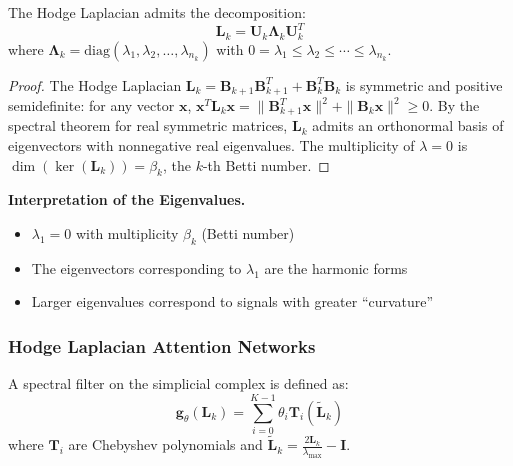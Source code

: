 \begin{theorem}\label{thm:descomposicion_hodge_laplacian}
The Hodge Laplacian admits the decomposition:
\begin{equation}
    \mathbf{L}_k = \mathbf{U}_k \boldsymbol{\Lambda}_k \mathbf{U}_k^T
\end{equation}
where $\boldsymbol{\Lambda}_k = \text{diag}(\lambda_1, \lambda_2, \ldots, \lambda_{n_k})$ with $0 = \lambda_1 \leq \lambda_2 \leq \cdots \leq \lambda_{n_k}$.
\end{theorem}

\begin{proof}
The Hodge Laplacian $\mathbf{L}_k = \mathbf{B}_{k+1}\mathbf{B}_{k+1}^T + \mathbf{B}_k^T\mathbf{B}_k$ is symmetric and positive semidefinite: for any vector $\mathbf{x}$, $\mathbf{x}^T \mathbf{L}_k \mathbf{x} = \|\mathbf{B}_{k+1}^T \mathbf{x}\|^2 + \|\mathbf{B}_k \mathbf{x}\|^2 \geq 0$. By the spectral theorem for real symmetric matrices, $\mathbf{L}_k$ admits an orthonormal basis of eigenvectors with nonnegative real eigenvalues. The multiplicity of $\lambda = 0$ is $\dim(\ker(\mathbf{L}_k)) = \beta_k$, the $k$-th Betti number.
\end{proof}

\textbf{Interpretation of the Eigenvalues.}\label{rem:interpretacion_autovalores_hodge}
\begin{itemize}
    \item $\lambda_1 = 0$ with multiplicity $\beta_k$ (Betti number)
    \item The eigenvectors corresponding to $\lambda_1$ are the harmonic forms
    \item Larger eigenvalues correspond to signals with greater ``curvature''
\end{itemize}

\subsubsection{Hodge Laplacian Attention Networks}

\begin{definition}\label{def:filtro_espectral_hodge}
A spectral filter on the simplicial complex is defined as:
\begin{equation}
    \mathbf{g}_{\theta}(\mathbf{L}_k) = \sum_{i=0}^{K-1} \theta_i \mathbf{T}_i(\tilde{\mathbf{L}}_k)
\end{equation}
where $\mathbf{T}_i$ are Chebyshev polynomials and $\tilde{\mathbf{L}}_k = \frac{2\mathbf{L}_k}{\lambda_{\max}} - \mathbf{I}$.
\end{definition}

